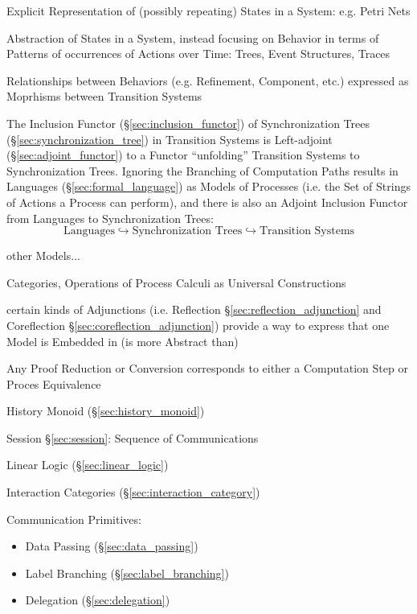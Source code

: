 Explicit Representation of (possibly repeating) States in a System:
e.g. Petri Nets

Abstraction of States in a System, instead focusing on Behavior in
terms of Patterns of occurrences of Actions over Time: Trees, Event
Structures, Traces


Relationships between Behaviors (e.g. Refinement, Component, etc.)
expressed as Moprhisms between Transition Systems

The Inclusion Functor (\S\ref{sec:inclusion_functor}) of
Synchronization Trees (\S\ref{sec:synchronization_tree}) in Transition
Systems is Left-adjoint (\S\ref{sec:adjoint_functor}) to a Functor
``unfolding'' Transition Systems to Synchronization Trees. Ignoring
the Branching of Computation Paths results in Languages
(\S\ref{sec:formal_language}) as Models of Processes (i.e. the Set of
Strings of Actions a Process can perform), and there is also an
Adjoint Inclusion Functor from Languages to Synchronization Trees:
\[
  \text{Languages} \hookrightarrow \text{Synchronization Trees}
    \hookrightarrow \text{Transition Systems}
\]

other Models...

Categories, Operations of Process Calculi as Universal Constructions

certain kinds of Adjunctions (i.e. Reflection
\S\ref{sec:reflection_adjunction} and Coreflection
\S\ref{sec:coreflection_adjunction}) provide a way to express that one
Model is Embedded in (is more Abstract than)


\asterism


Any Proof Reduction or Conversion corresponds to either a Computation
Step or Proces Equivalence \cite{caires-pfenning10}

History Monoid (\S\ref{sec:history_monoid})

Session \S\ref{sec:session}: Sequence of Communications

Linear Logic (\S\ref{sec:linear_logic})

Interaction Categories (\S\ref{sec:interaction_category})


Communication Primitives:
\begin{itemize}
  \item Data Passing (\S\ref{sec:data_passing})
  \item Label Branching (\S\ref{sec:label_branching})
  \item Delegation (\S\ref{sec:delegation})
\end{itemize}


